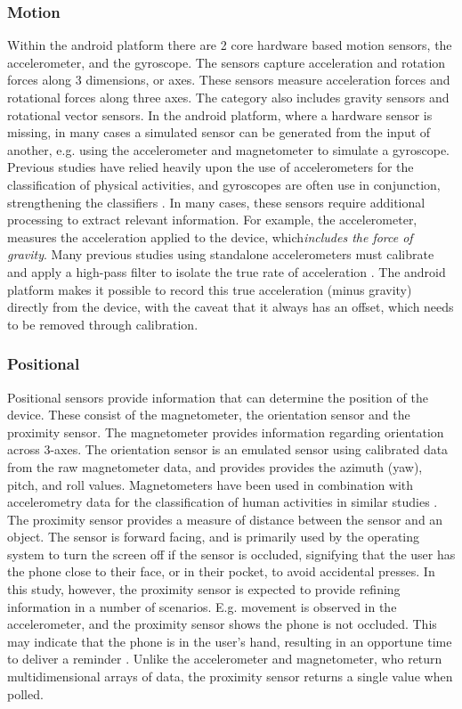 \subsubsection{Motion}
Within the android platform there are 2 core hardware based motion sensors, the accelerometer, and the gyroscope. The sensors capture acceleration and rotation forces along 3 dimensions, or axes. These sensors measure acceleration forces and rotational forces along three axes. The category also includes gravity sensors and rotational vector sensors.
In the android platform, where a hardware sensor is missing, in many cases a simulated sensor can be generated from the input of another, e.g. using the accelerometer and magnetometer to simulate a gyroscope.
Previous studies have relied heavily upon the use of accelerometers for the classification of physical activities, and gyroscopes are often use in conjunction, strengthening the classifiers \cite{Wu2012, Preece2009}. In many cases, these sensors require additional processing to extract relevant information. For example, the accelerometer, measures the acceleration applied to the device, which\textit{includes the force of gravity}. Many previous studies using standalone accelerometers must calibrate and apply a high-pass filter to isolate the true rate of acceleration \cite{Ferraris1995}. The android platform makes it possible to record this true acceleration (minus gravity) directly from the device, with the caveat that it always has an offset, which needs to be removed through calibration.

\subsubsection{Positional}
Positional sensors provide information that can determine the position of the device. These consist of the magnetometer, the orientation sensor and the proximity sensor.
The magnetometer provides information regarding orientation across 3-axes. The orientation sensor is an emulated sensor using calibrated data from the raw magnetometer data, and provides provides the azimuth (yaw), pitch, and roll values.
Magnetometers have been used in combination with accelerometry data for the classification of human activities in similar studies \cite{Zhang2015,Catal2015}.
The proximity sensor provides a measure of distance between the sensor and an object. The sensor is forward facing, and is primarily used by the operating system to turn the screen off if the sensor is occluded, signifying that the user has the phone close to their face, or in their pocket, to avoid accidental presses. In this study, however, the proximity sensor is expected to provide refining information in a number of scenarios. E.g. movement is observed in the accelerometer, and the proximity sensor shows the phone is not occluded. This may indicate that the phone is in the user's hand, resulting in an opportune time to deliver a reminder \cite{Hoseini-Tabatabaei2013}. Unlike the accelerometer and magnetometer, who return multidimensional arrays of data, the proximity sensor returns a single value when polled.

